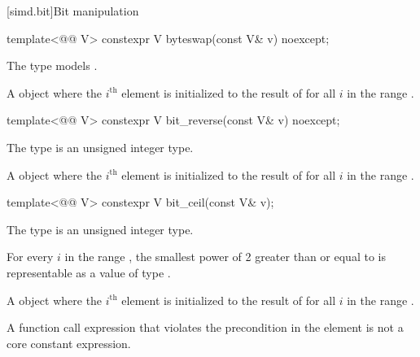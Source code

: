 [simd.bit]{Bit manipulation}

\begin{itemdecl}
template<@@ V> constexpr V byteswap(const V& v) noexcept;
\end{itemdecl}

\begin{itemdescr}
\pnum
\constraints
The type  models .

\pnum
\returns
A  object where the $i^\text{th}$ element is initialized to
the result of  for all $i$ in the range
.
\end{itemdescr}

\begin{itemdecl}
template<@@ V> constexpr V bit_reverse(const V& v) noexcept;
\end{itemdecl}

\begin{itemdescr}
\pnum
\constraints
The type  is an unsigned integer type.

\pnum
\returns
A  object where the $i^\text{th}$ element is initialized to
the result of  for all $i$ in the range
.
\end{itemdescr}

\begin{itemdecl}
template<@@ V> constexpr V bit_ceil(const V& v);
\end{itemdecl}

\begin{itemdescr}
\pnum
\constraints
The type  is an unsigned integer type.

\pnum
\expects
For every $i$ in the range , the smallest power of 2
greater than or equal to  is representable as a value of type
.

\pnum
\returns
A  object where the $i^\text{th}$ element is initialized to
the result of  for all $i$ in the range
.

\pnum
\remarks
A function call expression that violates the precondition in the \expects
element is not a core constant expression.
\end{itemdescr}

